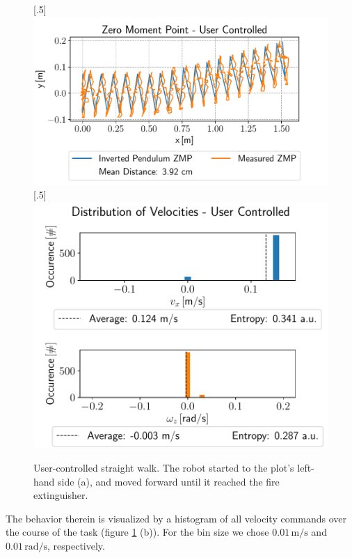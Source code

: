 \begin{figure}[h!]
	[.5\linewidth]{\includegraphics[scale=.45]{chapters/06_walking_experiments/01_user_controlled_walking/02_test_environment/straight_walk_01_zmp.pdf}}
	[.5\linewidth]{\includegraphics[scale=.45]{chapters/06_walking_experiments/01_user_controlled_walking/02_test_environment/straight_walk_01_entropy.pdf}}
	\caption{User-controlled straight walk. The robot started to the plot's left-hand side (a), and moved forward until it reached the fire extinguisher.}
	\label{fig::412_uc_straight}
\end{figure} 
The behavior therein is visualized by a histogram of all velocity commands over the course of the task (figure \ref{fig::412_uc_straight} (b)). For the bin size we chose $0.01\,\text{m}/\text{s}$ and $0.01\,\text{rad}/\text{s}$, respectively. 
